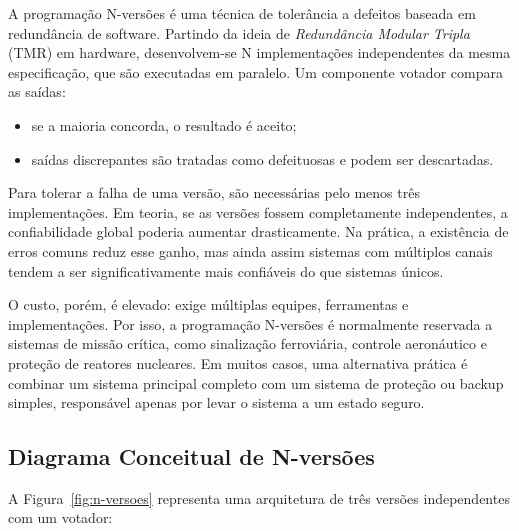 \documentclass[12pt,a4paper,twoside]{report}
\begin{document}
A programação N-versões é uma técnica de tolerância a defeitos baseada em
redundância de software. Partindo da ideia de \emph{Redundância Modular
Tripla} (TMR) em hardware, desenvolvem-se N implementações independentes da
mesma especificação, que são executadas em paralelo. Um componente votador
compara as saídas:
\begin{itemize}[nosep]
    \item se a maioria concorda, o resultado é aceito;
    \item saídas discrepantes são tratadas como defeituosas e podem ser
    descartadas.
\end{itemize}

Para tolerar a falha de uma versão, são necessárias pelo menos três
implementações. Em teoria, se as versões fossem completamente independentes,
a confiabilidade global poderia aumentar drasticamente. Na prática, a
existência de erros comuns reduz esse ganho, mas ainda assim sistemas com
múltiplos canais tendem a ser significativamente mais confiáveis do que
sistemas únicos.

O custo, porém, é elevado: exige múltiplas equipes, ferramentas e
implementações. Por isso, a programação N-versões é normalmente reservada a
sistemas de missão crítica, como sinalização ferroviária, controle
aeronáutico e proteção de reatores nucleares. Em muitos casos, uma
alternativa prática é combinar um sistema principal completo com um sistema
de proteção ou backup simples, responsável apenas por levar o sistema a um
estado seguro.

\subsection{Diagrama Conceitual de N-versões}

A Figura~\ref{fig:n-versoes} representa uma arquitetura de três versões
independentes com um votador:
\end{document}
